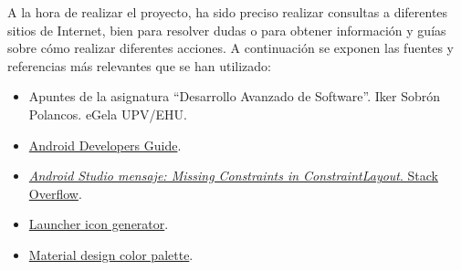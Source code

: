 A la hora de realizar el proyecto, ha sido preciso realizar consultas a diferentes sitios de Internet, bien para resolver dudas o para obtener información y guías sobre cómo realizar diferentes acciones. A continuación se exponen las fuentes y referencias más relevantes que se han utilizado:

\begin{itemize}
    \item Apuntes de la asignatura “Desarrollo Avanzado de Software”. Iker Sobrón Polancos. eGela UPV/EHU.
    \item \href{https://developer.android.com/}{Android Developers Guide}.
    \item \href{https://stackoverflow.com/questions/16616458/how-to-use-resource-arrays-using-xml-in-android}{\textit{Android Studio mensaje: Missing Constraints in ConstraintLayout}. Stack Overflow}.
    \item \href{https://romannurik.github.io/AndroidAssetStudio/icons-launcher.html}{Launcher icon generator}.
    \item \href{https://materialui.co/colors}{Material design color palette}.
\end{itemize}